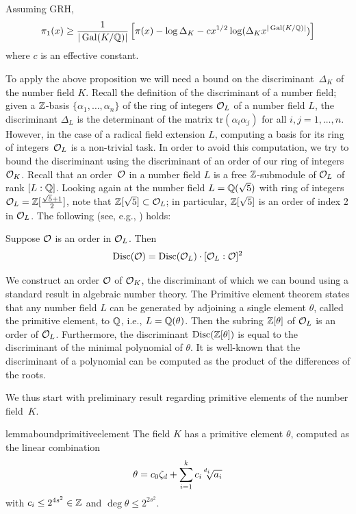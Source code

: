 \begin{proposition}[Bound on $\pi_{1}(x)$]\label{prop:number_of_primes}
Assuming GRH,
\[ \pi_{1}(x) \geq \frac{1}{|\operatorname{Gal}(K/\mathbb{Q})|} \left[ \pi(x) - \log \Delta_K - c x^{1/2} \log (\Delta_K x^{|\operatorname{Gal}(K/\mathbb{Q})|}) \right] \]
where $c$ is an effective constant.
\end{proposition}

To apply the above proposition we will need a bound on the discriminant~$\Delta_K$ of the number field $K$. Recall the definition of the discriminant of a number field; given a $\mathbb{Z}$-basis $\{\alpha_1,\ldots,\alpha_n\}$ of the ring of integers $\mathcal{O}_L$ of a number field $L$, the discriminant $\Delta_L$ is the determinant of the matrix $\mathrm{tr}(\alpha_i\alpha_j)$ for all $i,j=1,\ldots,n$.
However, in the case of a radical field extension $L$, 
 computing a basis for its ring of integers~$\mathcal{O}_L$ is a non-trivial task. In order to avoid this computation, we try to bound the discriminant using the discriminant of an order of our ring of integers $\mathcal{O}_K$. Recall that an order~$\mathcal{O}$ in a number field $L$
is a free $\mathbb{Z}$-submodule of $\mathcal{O}_L$ of rank $[L:\mathbb{Q}]$. 
Looking again at the number field $L=\mathbb{Q}(\sqrt{5})$ with ring of integers $\mathcal{O}_L=\mathbb{Z}[\frac{\sqrt{5}+1}{2}]$, note that $\mathbb{Z}[\sqrt{5}] \subset \mathcal{O}_L$; in particular, $\mathbb{Z}[\sqrt{5}]$ is an order of index 2 in $\mathcal{O}_L$. The following (see, e.g., \cite[Proposition 4.4.4]{cohen2013course}) holds:

 \begin{proposition}
 \label{prop:order_disc}
 Suppose $\mathcal{O}$ is an order in $\mathcal{O}_L$. Then
 \[ \operatorname{Disc}(\mathcal{O}) = \operatorname{Disc}(\mathcal{O}_L) \cdot [\mathcal{O}_L : \mathcal{O}]^2 \]
 \end{proposition}
 
We construct an order $\mathcal{O}$ of $\mathcal{O}_K$, the discriminant of which we can bound using a standard result in algebraic number theory. The Primitive element theorem states that any number field $L$ can be generated by adjoining a single element $\theta$, called the primitive element, to $\mathbb{Q}$, i.e., $L = \mathbb{Q}(\theta)$. Then the subring $\mathbb{Z}[\theta]$ of $\mathcal{O}_L$ is an order of $\mathcal{O}_L$. Furthermore, the discriminant $\operatorname{Disc}(\mathbb{Z}[\theta])$ is equal to the discriminant of the minimal polynomial of $\theta$.
It is well-known that the discriminant of a polynomial can be computed as the product of the differences of the roots.

We thus start with preliminary result regarding primitive elements of the number field~$K$.

\begin{restatable}{lemma}{boundprimitiveelement}\label{lem:primitive_el}
The field $K$ has a primitive element $\theta$, computed as the linear combination
\[ \theta = c_0 \zeta_d + \sum_{i=1}^k c_i \mysqrt{d_i}{a_i}\]
with $c_i \leq 2^{4s^2} \in \mathbb{Z}$ and $\deg \theta \leq 2^{2s^2}$.
\end{restatable}


